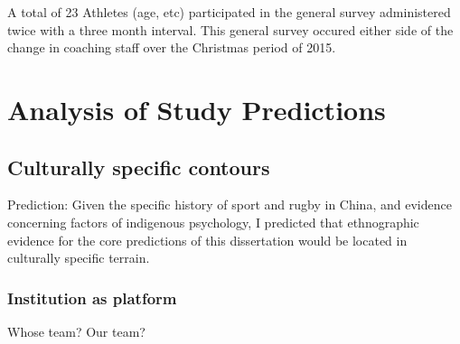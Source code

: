   A total of 23 Athletes (age, etc) participated in the general survey administered twice with a three month interval. This general survey occured either side of the change in coaching staff over the Christmas period of 2015.






\section{Analysis of Study Predictions}


  \subsection{Culturally specific contours}


    Prediction: Given the specific history of sport and rugby in China, and evidence concerning factors of indigenous psychology, I predicted that ethnographic evidence for the core predictions of this dissertation would be located in culturally specific terrain.


    \subsubsection{Institution as platform}

Whose team? Our team?






